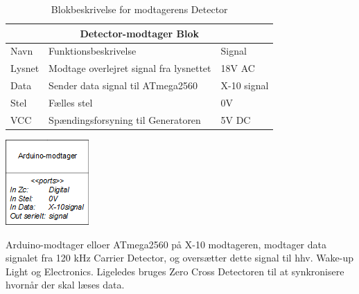 \documentclass[11pt]{article}
\begin{document}
\begin{table}[H]
\centering
	\begin{tabular}{l|l|l}
	
	\toprule[0.4mm]\midrule \multicolumn{3}{c}{\textbf{Detector-modtager Blok}}\\
	\midrule[0.4mm] Navn & Funktionsbeskrivelse & Signal\\ \midrule[0.3mm]
	 Lysnet & Modtage overlejret signal fra lysnettet & 18V AC\\
	 Data & Sender data signal til ATmega2560 & X-10 signal\\
	 Stel & Fælles stel  & 0V\\
	 VCC & Spændingsforsyning til Generatoren & 5V DC\\
 	 
	 \midrule\bottomrule[0.4mm]

	\end{tabular}
	\caption{Blokbeskrivelse for modtagerens Detector}
	\label{tab: Bloktabel Detector modtager}
\end{table}
\qquad

\begin{minipage}[Ht]{0.40\linewidth}
	\centering
	\includegraphics{Arduino-modtager-blok.png}
\end{minipage}
\hfill
\begin{minipage}[!t]{0.60\linewidth}
	\centering
   		Arduino-modtager elloer ATmega2560 på X-10 modtageren, modtager data signalet fra 120 kHz Carrier Detector, og oversætter dette signal til hhv. Wake-up Light og Electronics. Ligeledes bruges Zero Cross Detectoren til at synkronisere hvornår der skal læses data.
\end{minipage}%
\hfill
\end{document}
